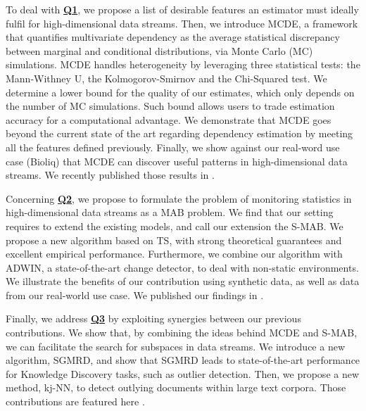To deal with \hyperlink{Q1}{\textbf{Q1}}, we propose a list of desirable features an estimator must ideally fulfil for high-dimensional data streams. Then, we introduce \gls{MCDE}, a framework that quantifies multivariate dependency as the average statistical discrepancy between marginal and conditional distributions, via Monte Carlo (MC) simulations. \gls{MCDE} handles heterogeneity by leveraging three statistical tests: the Mann-Withney U, the Kolmogorov-Smirnov and the Chi-Squared test. We determine a lower bound for the quality of our estimates, which only depends on the number of MC simulations. Such bound allows users to trade estimation accuracy for a computational advantage. We demonstrate that \gls{MCDE} goes beyond the current state of the art regarding dependency estimation by meeting all the features defined previously. Finally, we show against our real-word use case (\gls{Bioliq}) that \gls{MCDE} can discover useful patterns in high-dimensional data streams. We recently published those results in \cite{DBLP:conf/ssdbm/FoucheB19, DBLP:conf/ssdbm/FoucheBMKB20}. 

Concerning \hyperlink{Q2}{\textbf{Q2}}, we propose to formulate the problem of monitoring statistics in high-dimensional data streams as a \gls{MAB} problem. We find that our setting requires to extend the existing models, and call our extension the \gls{S-MAB}. We propose a new algorithm based on \gls{TS}, with strong theoretical guarantees and excellent empirical performance. Furthermore, we combine our algorithm with \gls{ADWIN}, a state-of-the-art change detector, to deal
with non-static environments. We illustrate the benefits of our contribution using synthetic data, as well as data from our real-world use case. We published our findings in \cite{DBLP:conf/kdd/FoucheKB19}. 

Finally, we address \hyperlink{Q3}{\textbf{Q3}} by exploiting synergies between our previous contributions. We show that, by combining the ideas behind \gls{MCDE} and \gls{S-MAB}, we can facilitate the search for subspaces in data streams. We introduce a new algorithm, \gls{SGMRD}, and show that \gls{SGMRD} leads to state-of-the-art performance for Knowledge Discovery tasks, such as outlier detection. Then, we propose a new method, \gls{kj-NN}, to detect outlying documents within large text corpora. Those contributions are featured here \cite{DBLP:conf/ssdbm/FoucheMGZBH20, DBLP:conf/review/FoucheKB20}.


